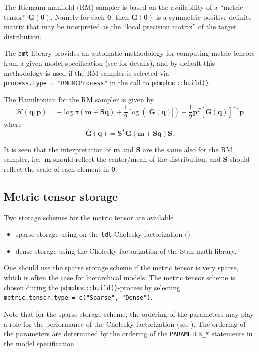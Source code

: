 \documentclass[
]{book}
\begin{document}
The Riemann manifold (RM) sampler is based on the availability of a ``metric tensor'' \(\mathbf G(\boldsymbol \theta)\). Namely for each \(\boldsymbol \theta\), then \(\mathbf G(\boldsymbol \theta)\) is a symmetric positive definite matrix that may be interpreted as the ``local precision matrix'' of the target distribution.

The \texttt{amt}-library provides an automatic methodology for computing metric tensors from a given model specification (see \citet{kleppe_amt} for details), and by default this methodology is used if the RM sampler is selected via \texttt{process.type\ =\ "RMHMCProcess"} in the call to \texttt{pdmphmc::build()}.

The Hamiltonian for the RM sampler is given by
\[
\mathcal H(\mathbf q,\mathbf p) = -\log \bar \pi(\mathbf m + \mathbf S \mathbf q) + \frac{1}{2}\log(|\bar{\mathbf G}(\mathbf q)|) + \frac{1}{2}\mathbf p^T[\bar{\mathbf G}(\mathbf q)]^{-1}\mathbf p
\]
where
\[
\bar{\mathbf G}(\mathbf q) = \mathbf S^T \mathbf G(\mathbf m + \mathbf S \mathbf q) \mathbf S.
\]

It is seen that the interpretation of \(\mathbf m\) and \(\mathbf S\) are the same also for the RM sampler, i.e.~\(\mathbf m\) should reflect the center/mean of the distribution, and \(\mathbf S\) should reflect the scale of each element in \(\boldsymbol \theta\).

\hypertarget{metric-tensor-storage}{%
\subsection{Metric tensor storage}\label{metric-tensor-storage}}

Two storage schemes for the metric tensor are available

\begin{itemize}
\item
  sparse storage using on the \texttt{ldl} Cholesky factorization (\citet{davis_ldl})
\item
  dense storage using the Cholesky factorization of the Stan math library.
\end{itemize}

One should use the sparse storage scheme if the metric tensor is very sparse, which is often the case for hierarchical models.
The metric tensor scheme is chosen during the \texttt{pdmphmc::build()}-process by selecting \texttt{metric.tensor.type\ =\ c("Sparse",\ "Dense")}.

Note that for the sparse storage scheme, the ordering of the parameters may play a role for the performance of the Cholesky factorization (see \citet{davis_sparse}). The ordering of the parameters are determined by the ordering of the \texttt{PARAMETER\_*} statements in the model specification.
\end{document}
